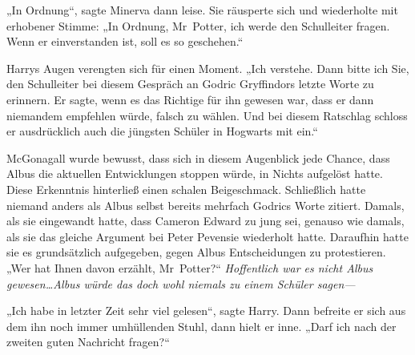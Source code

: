 „In Ordnung“, sagte Minerva dann leise. Sie räusperte sich und wiederholte mit erhobener Stimme: „In Ordnung, Mr~Potter, ich werde den Schulleiter fragen. Wenn er einverstanden ist, soll es so geschehen.“

Harrys Augen verengten sich für einen Moment. „Ich verstehe. Dann bitte ich Sie, den Schulleiter bei diesem Gespräch an Godric Gryffindors letzte Worte zu erinnern. Er sagte, wenn es das Richtige für ihn gewesen war, dass er dann niemandem empfehlen würde, falsch zu wählen. Und bei diesem Ratschlag schloss er ausdrücklich auch die jüngsten Schüler in Hogwarts mit ein.“

McGonagall wurde bewusst, dass sich in diesem Augenblick jede Chance, dass Albus die aktuellen Entwicklungen stoppen würde, in Nichts aufgelöst hatte. Diese Erkenntnis hinterließ einen schalen Beigeschmack. Schließlich hatte niemand anders als Albus selbst bereits mehrfach Godrics Worte zitiert. Damals, als sie eingewandt hatte, dass Cameron Edward zu jung sei, genauso wie damals, als sie das gleiche Argument bei Peter Pevensie wiederholt hatte. Daraufhin hatte sie es grundsätzlich aufgegeben, gegen Albus Entscheidungen zu protestieren.
„Wer hat Ihnen davon erzählt, Mr~Potter?“ \emph{Hoffentlich war es nicht Albus gewesen…Albus würde das doch wohl niemals zu einem Schüler \emph{sagen}—}

„Ich habe in letzter Zeit sehr viel gelesen“, sagte Harry. Dann befreite er sich aus dem ihn noch immer umhüllenden Stuhl, dann hielt er inne. „Darf ich nach der zweiten guten Nachricht fragen?“

